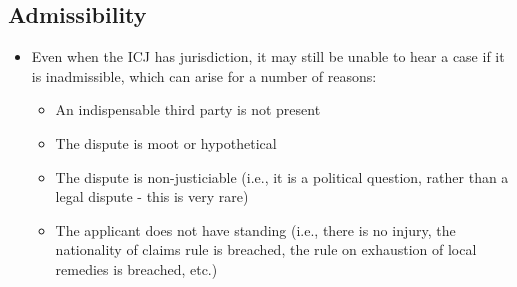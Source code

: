 \subsection{Admissibility}
\begin{itemize}
    \item Even when the ICJ has jurisdiction, it may still be unable to hear a case if it is inadmissible, which can arise for a number of reasons:
    \begin{itemize}
        \item An indispensable third party is not present
        \item The dispute is moot or hypothetical
        \item The dispute is non-justiciable (i.e., it is a political question, rather than a legal dispute - this is very rare)
        \item The applicant does not have standing (i.e., there is no injury, the nationality of claims rule is breached, the rule on exhaustion of local remedies is breached, etc.)
    \end{itemize}
\end{itemize}

